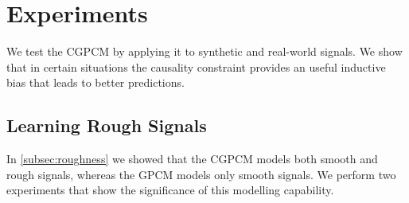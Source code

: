 \documentclass{article}
\begin{document}
\section{Experiments}
We test the CGPCM by applying it to synthetic and real-world signals. We show that in certain situations the causality constraint provides an useful inductive bias that leads to better predictions.


\subsection{Learning Rough Signals}
In \cref{subsec:roughness} we showed that the CGPCM models both smooth and rough signals, whereas the GPCM models only smooth signals. We perform two experiments that show the significance of this modelling capability.
\end{document}
